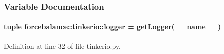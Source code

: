 \subsubsection{\-Variable \-Documentation}
\hypertarget{namespaceforcebalance_1_1tinkerio_a2213c6a64efe42ee845dad485eee582e}{
\paragraph[{logger}]{\setlength{\rightskip}{0pt plus 5cm}tuple {\bf forcebalance\-::tinkerio\-::logger} = get\-Logger(\-\_\-\-\_\-name\-\_\-\-\_\-)}}\label{namespaceforcebalance_1_1tinkerio_a2213c6a64efe42ee845dad485eee582e}


\-Definition at line 32 of file tinkerio.\-py.

